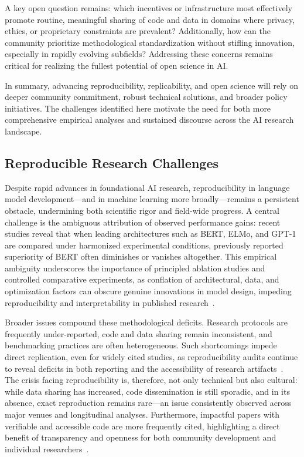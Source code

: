 \documentclass[sigconf]{acmart}
\begin{document}
A key open question remains: which incentives or infrastructure most effectively promote routine, meaningful sharing of code and data in domains where privacy, ethics, or proprietary constraints are prevalent? Additionally, how can the community prioritize methodological standardization without stifling innovation, especially in rapidly evolving subfields? Addressing these concerns remains critical for realizing the fullest potential of open science in AI.

In summary, advancing reproducibility, replicability, and open science will rely on deeper community commitment, robust technical solutions, and broader policy initiatives. The challenges identified here motivate the need for both more comprehensive empirical analyses and sustained discourse across the AI research landscape.

\subsection{Reproducible Research Challenges}

Despite rapid advances in foundational AI research, reproducibility in language model development—and in machine learning more broadly—remains a persistent obstacle, undermining both scientific rigor and field-wide progress. A central challenge is the ambiguous attribution of observed performance gains: recent studies reveal that when leading architectures such as BERT, ELMo, and GPT-1 are compared under harmonized experimental conditions, previously reported superiority of BERT often diminishes or vanishes altogether. This empirical ambiguity underscores the importance of principled ablation studies and controlled comparative experiments, as conflation of architectural, data, and optimization factors can obscure genuine innovations in model design, impeding reproducibility and interpretability in published research~\cite{ref107}.

Broader issues compound these methodological deficits. Research protocols are frequently under-reported, code and data sharing remain inconsistent, and benchmarking practices are often heterogeneous. Such shortcomings impede direct replication, even for widely cited studies, as reproducibility audits continue to reveal deficits in both reporting and the accessibility of research artifacts~\cite{ref107,ref108}. The crisis facing reproducibility is, therefore, not only technical but also cultural: while data sharing has increased, code dissemination is still sporadic, and in its absence, exact reproduction remains rare—an issue consistently observed across major venues and longitudinal analyses. Furthermore, impactful papers with verifiable and accessible code are more frequently cited, highlighting a direct benefit of transparency and openness for both community development and individual researchers~\cite{ref108}.
\end{document}
